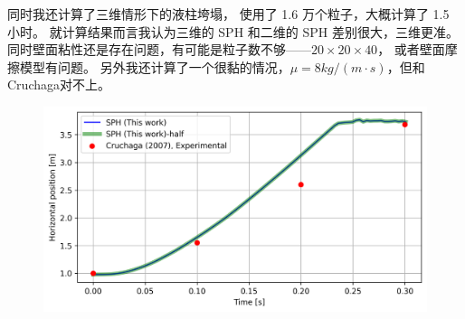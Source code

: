 \begin{frame}
    同时我还计算了三维情形下的液柱垮塌，
    使用了 1.6 万个粒子，大概计算了 1.5 小时。
    就计算结果而言我认为三维的 SPH 和二维的 SPH 差别很大，三维更准。
    同时壁面粘性还是存在问题，有可能是粒子数不够——$20\times 20\times 40$，
    或者壁面摩擦模型有问题。
    另外我还计算了一个很黏的情况，$\mu=8kg/(m\cdot s)$，但和Cruchaga对不上。
    \begin{figure}[H]
        \centering
        \includegraphics[width=\textwidth]{images/Cruchaga/3d/cruchaga_3d.png}
    \end{figure}
\end{frame}